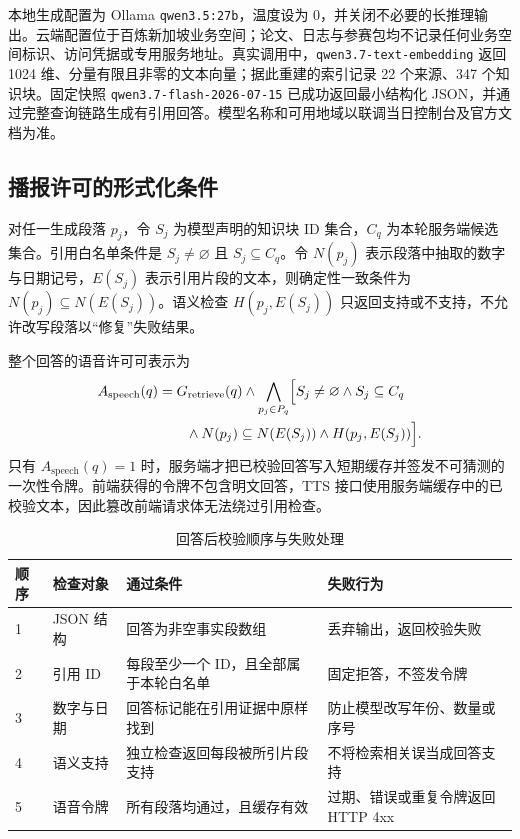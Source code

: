 \documentclass[UTF8,zihao=-4,fontset=none,twoside]{ctexart}
\newcommand{\code}[1]{\mbox{\texttt{#1}}\nobreak}
\begin{document}
本地生成配置为 Ollama \code{qwen3.5:27b}，温度设为 0，并关闭不必要的长推理输出。云端配置位于百炼新加坡业务空间；论文、日志与参赛包均不记录任何业务空间标识、访问凭据或专用服务地址。真实调用中，\code{qwen3.7-text-embedding} 返回 1024 维、分量有限且非零的文本向量；据此重建的索引记录 22 个来源、347 个知识块。固定快照 \code{qwen3.7-flash-2026-07-15} 已成功返回最小结构化 JSON，并通过完整查询链路生成有引用回答。模型名称和可用地域以联调当日控制台及官方文档为准\cite{aliyunEmbedding,aliyunTts}。

\subsection{播报许可的形式化条件}

对任一生成段落 $p_j$，令 $S_j$ 为模型声明的知识块 ID 集合，$C_q$ 为本轮服务端候选集合。引用白名单条件是 $S_j\neq\varnothing$ 且 $S_j\subseteq C_q$。令 $N(p_j)$ 表示段落中抽取的数字与日期记号，$E(S_j)$ 表示引用片段的文本，则确定性一致条件为 $N(p_j)\subseteq N(E(S_j))$。语义检查 $H(p_j,E(S_j))$ 只返回支持或不支持，不允许改写段落以“修复”失败结果。

整个回答的语音许可可表示为
\begin{equation}
  \begin{aligned}
    A_{\mathrm{speech}}(q)&=G_{\mathrm{retrieve}}(q)\land
    \bigwedge_{p_j\in P_q}\Bigl[S_j\neq\varnothing\land S_j\subseteq C_q\\
    &\qquad\land N(p_j)\subseteq N(E(S_j))\land H(p_j,E(S_j))\Bigr].
  \end{aligned}
  \label{eq:speech-authorisation}
\end{equation}
只有 $A_{\mathrm{speech}}(q)=1$ 时，服务端才把已校验回答写入短期缓存并签发不可猜测的一次性令牌。前端获得的令牌不包含明文回答，TTS 接口使用服务端缓存中的已校验文本，因此篡改前端请求体无法绕过引用检查。

\begin{table}[htbp]
\centering
\caption{回答后校验顺序与失败处理}
\label{tab:post-validation}
\small
\begin{tabularx}{\linewidth}{@{}C{13mm}P{38mm}Y Y@{}}
\toprule
顺序 & 检查对象 & 通过条件 & 失败行为 \\
 & JSON 结构 & 回答为非空事实段数组 & 丢弃输出，返回校验失败 \\
2 & 引用 ID & 每段至少一个 ID，且全部属于本轮白名单 & 固定拒答，不签发令牌 \\
3 & 数字与日期 & 回答标记能在引用证据中原样找到 & 防止模型改写年份、数量或序号 \\
4 & 语义支持 & 独立检查返回每段被所引片段支持 & 不将检索相关误当成回答支持 \\
5 & 语音令牌 & 所有段落均通过，且缓存有效 & 过期、错误或重复令牌返回 HTTP 4xx \\
\bottomrule
\end{tabularx}
\end{table}
\end{document}
